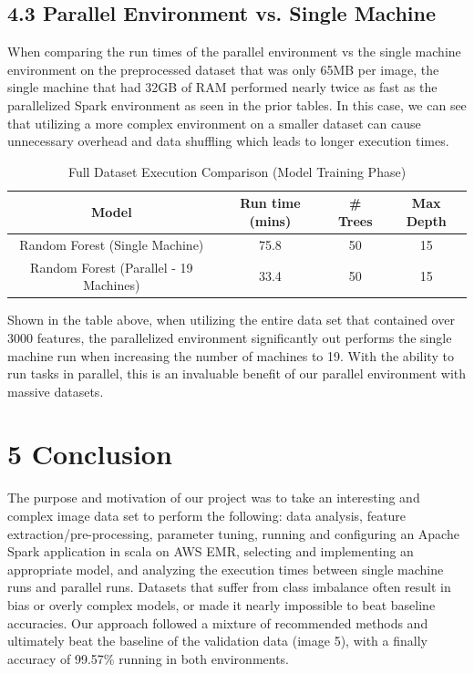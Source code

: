 \documentclass{neu_handout}
\begin{document}
\subsection*{4.3 Parallel Environment vs. Single Machine}

When comparing the run times of the parallel environment vs the single machine environment on the preprocessed dataset that was only 65MB per image, the single machine that had 32GB of RAM performed nearly twice as fast as the parallelized Spark environment as seen in the prior tables. In this case, we can see that utilizing a more complex environment on a smaller dataset can cause unnecessary overhead and data shuffling which leads to longer execution times.

\begin{table}[h!]
\centering
 \begin{tabular}{||c c c c||} 
 \hline
Model & Run time (mins) & \# Trees & Max Depth \\ [0.5ex] 
 \hline\hline
Random Forest (Single Machine) & 75.8  & 50 & 15  \\[1ex] 
 \hline
 Random Forest (Parallel - 19 Machines) & 33.4  & 50 & 15 \\
\hline
 \end{tabular}
 \caption{Full Dataset Execution Comparison (Model Training Phase)}
 \label{tab:accuracy-comparison}
\end{table}

Shown in the table above, when utilizing the entire data set that contained over 3000 features, the parallelized environment significantly out performs the single machine run when increasing the number of machines to 19. With the ability to run tasks in parallel, this is an invaluable benefit of our parallel environment with massive datasets.






\section*{5 Conclusion}
The purpose and motivation of our project was to take an interesting and complex image data set to perform the following: data analysis, feature extraction/pre-processing, parameter tuning, running and configuring an Apache Spark application in scala on AWS EMR, selecting and implementing an appropriate model, and analyzing the execution times between single machine runs and parallel runs. Datasets that suffer from class imbalance often result in bias or overly complex models, or made it nearly impossible to beat baseline accuracies. Our approach followed a mixture of recommended methods and ultimately beat the baseline of the validation data (image 5), with a finally accuracy of 99.57\% running in both environments.\\
\end{document}
